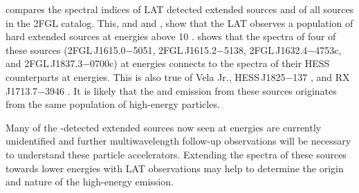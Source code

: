  compares the spectral indices of LAT
detected extended sources and of all sources in the 2FGL catalog. This, and
 and ,
show that the LAT observes a population of hard extended sources
at energies above 10 \gev.   shows that
the spectra of four of these sources (2FGL\,J1615.0$-$5051,
2FGL\,J1615.2$-$5138, 2FGL\,J1632.4$-$4753c, and 2FGL\,J1837.3$-$0700c)
at \gev energies connects to the spectra of their \ac{HESS} counterparts
at \tev energies. This is also true of Vela Jr., HESS\,J1825$-$137
\citep{grondin_2011a_detection-pulsar}, and RX\,J1713.7$-$3946 \citep{abdo_2011a_observations-young}.
It is likely that the \gev and \tev emission from these sources originates
from the same population of high-energy particles.

Many of the \tev-detected extended sources now seen at \gev energies
are currently unidentified and further multiwavelength follow-up
observations will be necessary to understand these particle accelerators.
Extending the spectra of these \tev sources towards lower energies
with LAT observations may help to determine the origin and nature of
the high-energy emission.




